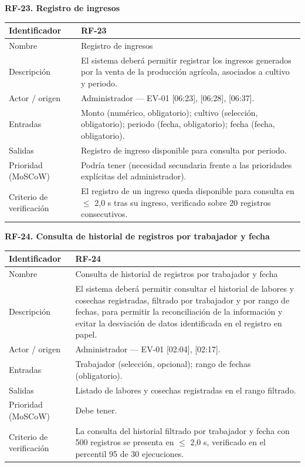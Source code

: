 \documentclass[12pt,a4paper]{article}
\begin{document}
\bigskip
\noindent\textbf{RF-23. Registro de ingresos}
\label{tab:RF-23}

\begin{center}
\begin{longtable}{|p{3.5cm}|p{10.7cm}|}
\hline
Identificador & RF-23 \\
\hline
Nombre & Registro de ingresos \\
\hline
Descripción & El sistema deberá permitir registrar los ingresos generados por la venta de la producción agrícola, asociados a cultivo y periodo. \\
\hline
Actor / origen & Administrador --- EV-01 [06:23], [06:28], [06:37]. \\
\hline
Entradas & Monto (numérico, obligatorio); cultivo (selección, obligatorio); periodo (fecha, obligatorio); fecha (fecha, obligatorio). \\
\hline
Salidas & Registro de ingreso disponible para consulta por periodo. \\
\hline
Prioridad (MoSCoW) & Podría tener (necesidad secundaria frente a las prioridades explícitas del administrador). \\
\hline
Criterio de verificación & El registro de un ingreso queda disponible para consulta en $\leq$ 2,0 s tras su ingreso, verificado sobre 20 registros consecutivos. \\
\hline
\end{longtable}
\end{center}

\bigskip
\noindent\textbf{RF-24. Consulta de historial de registros por trabajador y fecha}
\label{tab:RF-24}

\begin{center}
\begin{longtable}{|p{3.5cm}|p{10.7cm}|}
\hline
Identificador & RF-24 \\
\hline
Nombre & Consulta de historial de registros por trabajador y fecha \\
\hline
Descripción & El sistema deberá permitir consultar el historial de labores y cosechas registradas, filtrado por trabajador y por rango de fechas, para permitir la reconciliación de la información y evitar la desviación de datos identificada en el registro en papel. \\
\hline
Actor / origen & Administrador --- EV-01 [02:04], [02:17]. \\
\hline
Entradas & Trabajador (selección, opcional); rango de fechas (obligatorio). \\
\hline
Salidas & Listado de labores y cosechas registradas en el rango filtrado. \\
\hline
Prioridad (MoSCoW) & Debe tener. \\
\hline
Criterio de verificación & La consulta del historial filtrado por trabajador y fecha con 500 registros se presenta en $\leq$ 2,0 s, verificado en el percentil 95 de 30 ejecuciones. \\
\hline
\end{longtable}
\end{center}
\end{document}
